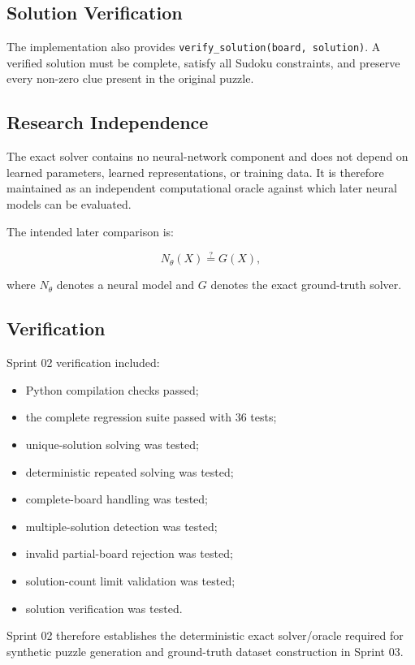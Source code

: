 \documentclass[11pt,a4paper]{article}
\begin{document}
\subsection{Solution Verification}

The implementation also provides \texttt{verify\_solution(board, solution)}.
A verified solution must be complete, satisfy all Sudoku constraints, and
preserve every non-zero clue present in the original puzzle.

\subsection{Research Independence}

The exact solver contains no neural-network component and does not depend
on learned parameters, learned representations, or training data. It is
therefore maintained as an independent computational oracle against which
later neural models can be evaluated.

The intended later comparison is:

\[
N_{\theta}(X) \stackrel{?}{=} G(X),
\]

where $N_{\theta}$ denotes a neural model and $G$ denotes the exact
ground-truth solver.

\subsection{Verification}

Sprint 02 verification included:

\begin{itemize}
    \item Python compilation checks passed;
    \item the complete regression suite passed with 36 tests;
    \item unique-solution solving was tested;
    \item deterministic repeated solving was tested;
    \item complete-board handling was tested;
    \item multiple-solution detection was tested;
    \item invalid partial-board rejection was tested;
    \item solution-count limit validation was tested;
    \item solution verification was tested.
\end{itemize}

Sprint 02 therefore establishes the deterministic exact solver/oracle
required for synthetic puzzle generation and ground-truth dataset
construction in Sprint 03.
\end{document}
